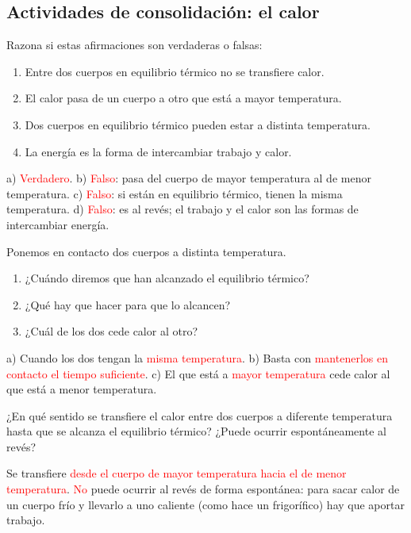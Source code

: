 \subsection*{Actividades de consolidación: el calor}

\begin{exercise}
    Razona si estas afirmaciones son verdaderas o falsas:
    \begin{enumerate}[label=\alph*)]
        \item Entre dos cuerpos en equilibrio térmico no se transfiere calor.
        \item El calor pasa de un cuerpo a otro que está a mayor temperatura.
        \item Dos cuerpos en equilibrio térmico pueden estar a distinta temperatura.
        \item La energía es la forma de intercambiar trabajo y calor.
    \end{enumerate}
    \begin{solu}
        a) \textcolor{red}{Verdadero}. b) \textcolor{red}{Falso}: pasa del cuerpo de mayor temperatura al de menor temperatura. c) \textcolor{red}{Falso}: si están en equilibrio térmico, tienen la misma temperatura. d) \textcolor{red}{Falso}: es al revés; el trabajo y el calor son las formas de intercambiar energía.
    \end{solu}
\end{exercise}

\begin{exercise}
    Ponemos en contacto dos cuerpos a distinta temperatura.
    \begin{enumerate}[label=\alph*)]
        \item ¿Cuándo diremos que han alcanzado el equilibrio térmico?
        \item ¿Qué hay que hacer para que lo alcancen?
        \item ¿Cuál de los dos cede calor al otro?
    \end{enumerate}
    \begin{solu}
        a) Cuando los dos tengan la \textcolor{red}{misma temperatura}. b) Basta con \textcolor{red}{mantenerlos en contacto el tiempo suficiente}. c) El que está a \textcolor{red}{mayor temperatura} cede calor al que está a menor temperatura.
    \end{solu}
\end{exercise}

\begin{exercise}
    ¿En qué sentido se transfiere el calor entre dos cuerpos a diferente temperatura hasta que se alcanza el equilibrio térmico? ¿Puede ocurrir espontáneamente al revés?
    \begin{solu}
        Se transfiere \textcolor{red}{desde el cuerpo de mayor temperatura hacia el de menor temperatura}. \textcolor{red}{No} puede ocurrir al revés de forma espontánea: para sacar calor de un cuerpo frío y llevarlo a uno caliente (como hace un frigorífico) hay que aportar trabajo.
    \end{solu}
\end{exercise}

